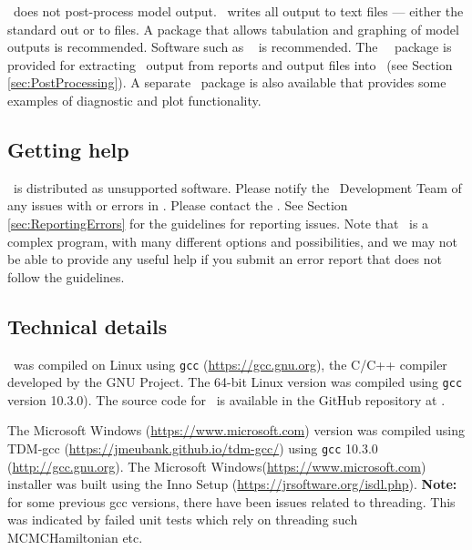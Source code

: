 \CNAME\ does not post-process model output. \CNAME\ writes all output to text files --- either the standard out or to files. A package that allows tabulation and graphing of model outputs is recommended. Software such as \href{http://www.r-project.org}{\R}\ \citep{R} is recommended. The \CNAME\ \R\ package is provided for extracting \CNAME\ output from reports and output files into \R\ (see Section \ref{sec:PostProcessing}). A separate \R\ package is also available that provides some examples of diagnostic and plot functionality.

\subsection{Getting help}

\CNAME\ is distributed as unsupported software. Please notify the \CNAME\ Development Team of any issues with or errors in \CNAME. Please contact the \emaillink. See Section \ref{sec:ReportingErrors} for the guidelines for reporting issues. Note that \CNAME\ is a complex program, with many different options and possibilities, and we may not be able to provide any useful help if you submit an error report that does not follow the guidelines.

\subsection{Technical details}\label{sec:TechnicalDetails}

\CNAME\ was compiled on Linux using \texttt{gcc} (\url{https://gcc.gnu.org}), the C/C++ compiler developed by the GNU Project. The 64-bit Linux  version was compiled using \texttt{gcc} version 10.3.0). The source code for \CNAME\ is available in the GitHub repository at \github.

The Microsoft Windows (\url{https://www.microsoft.com}) version was compiled using TDM-gcc (\url{https://jmeubank.github.io/tdm-gcc/}) using \texttt{gcc} 10.3.0 (\url{http://gcc.gnu.org}). The Microsoft Windows(\url{https://www.microsoft.com}) installer was built using the Inno Setup (\url{https://jrsoftware.org/isdl.php}). \textbf{Note:} for some previous gcc versions, there have been issues related to threading. This was indicated by failed unit tests which rely on threading such MCMCHamiltonian etc.

